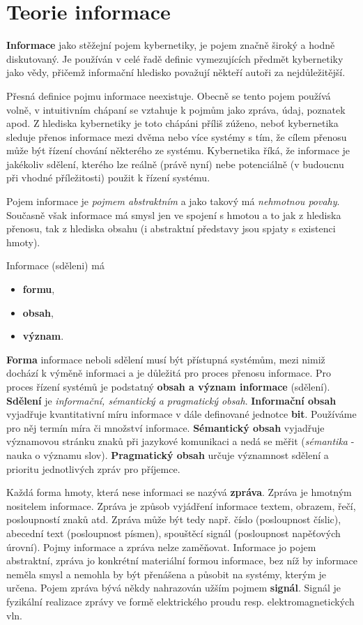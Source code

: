      
  \section{Teorie informace}
    \textbf{Informace} jako stěžejní pojem kybernetiky, je pojem značně široký a hodně diskutovaný. 
    Je používán v celé řadě definic vymezujících předmět kybernetiky jako vědy, přičemž informační 
    hledisko považují někteří autoři za nejdůležitější.
      
    Přesná definice pojmu informace neexistuje. Obecně se tento pojem používá volně, v intuitivním 
    chápaní se vztahuje k pojmům jako zpráva, údaj, poznatek apod. Z hlediska kybernetiky je toto 
    chápáni příliš zúženo, neboť kybernetika sleduje přenos informace mezi dvěma nebo více systémy 
    s tím, že cílem přenosu může být řízení chování některého ze systému. Kybernetika říká, že 
    informace je jakékoliv sdělení, kterého lze reálně (právě nyní) nebe potenciálně (v budoucnu 
    při vhodné příležitosti) použit k řízení systému.
    
    Pojem informace je \emph{pojmem abstraktním} a jako takový má \emph{nehmotnou povahy}. 
    Současně však informace má smysl jen ve spojení s hmotou a to jak z hlediska přenosu, tak z 
    hlediska obsahu (i abstraktní představy jsou spjaty s existenci hmoty).
    
    Informace (sděleni) má
    \begin{itemize}\addtolength{\itemsep}{-0.4\baselineskip}
      \item \textbf{formu},
      \item \textbf{obsah},
      \item \textbf{význam}.
    \end{itemize}
    \textbf{Forma} informace neboli sdělení musí být přístupná systémům, mezi nimiž dochází k 
    výměně informaci a je důležitá pro proces přenosu informace. Pro proces řízení systémů je 
    podstatný \textbf{obsah a význam informace} (sdělení). \textbf{Sdělení} je \emph{informační, 
    sémantický a pragmatický obsah}. \textbf{Informační obsah} vyjadřuje kvantitativní míru 
    informace v dále definované jednotce \textbf{bit}. Používáme pro něj termín míra či množství 
    informace. \textbf{Sémantický obsah} vyjadřuje významovou stránku znaků při jazykové komunikaci 
    a nedá se měřit (\emph{sémantika} - nauka o významu slov). \textbf{Pragmatický obsah} určuje 
    významnost sdělení a prioritu jednotlivých zpráv pro příjemce.
    
    Každá forma hmoty, která nese informaci se nazývá \textbf{zpráva}. Zpráva je hmotným nositelem 
    informace. Zpráva je způsob vyjádření informace textem, obrazem, řečí, posloupností znaků atd. 
    Zpráva může být tedy např. číslo (posloupnost číslic), abecední text (posloupnost písmen), 
    spouštěcí signál (posloupnost napěťových úrovní). Pojmy informace a zpráva nelze zaměňovat. 
    Informace jo pojem abstraktní, zpráva jo konkrétní materiální formou informace, bez níž by 
    informace neměla smysl a nemohla by být přenášena a působit na systémy, kterým je určena. Pojem 
    zpráva bývá někdy nahrazován užším pojmem \textbf{signál}. Signál je fyzikální realizace zprávy 
    ve formě elektrického proudu resp. elektromagnetických vln.
      
